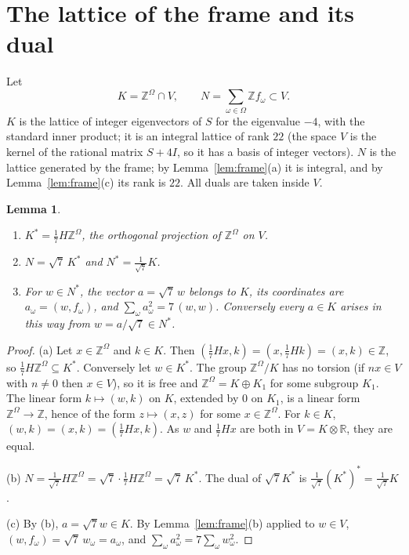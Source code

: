 \documentclass[11pt,a4paper]{article}
\newtheorem{lemma}[theorem]{Lemma}
\theoremstyle{definition}
\theoremstyle{remark}
\newcommand{\ZZ}{\mathbb{Z}}
\newcommand{\RR}{\mathbb{R}}
\newcommand{\Om}{\Omega}
\begin{document}
\section{The lattice of the frame and its dual}\label{sec:lat}

Let
\[
K=\ZZ^{\Om}\cap V,\qquad N=\sum_{\omega\in\Om}\ZZ f_\omega\subset V .
\]
$K$ is the lattice of integer eigenvectors of $S$ for the eigenvalue $-4$, with the standard inner product; it is an
integral lattice of rank $22$ (the space $V$ is the kernel of the rational matrix $S+4I$, so it has a basis of
integer vectors). $N$ is the lattice generated by the frame; by Lemma~\ref{lem:frame}(a) it is integral, and by
Lemma~\ref{lem:frame}(c) its rank is $22$. All duals are taken inside $V$.

\begin{lemma}\label{lem:NK}
\begin{enumerate}[label=\textup{(\alph*)}]
\item $K^*=\frac17H\ZZ^{\Om}$, the orthogonal projection of $\ZZ^{\Om}$ on $V$.
\item $N=\sqrt7\,K^*$ and $N^*=\frac1{\sqrt7}K$.
\item For $w\in N^*$, the vector $a=\sqrt7\,w$ belongs to $K$, its coordinates are $a_\omega=(w,f_\omega)$, and
$\sum_\omega a_\omega^2=7\,(w,w)$. Conversely every $a\in K$ arises in this way from $w=a/\sqrt7\in N^*$.
\end{enumerate}
\end{lemma}
\begin{proof}
(a) Let $x\in\ZZ^{\Om}$ and $k\in K$. Then $(\frac17Hx,k)=(x,\frac17Hk)=(x,k)\in\ZZ$, so $\frac17H\ZZ^{\Om}\subseteq
K^*$. Conversely let $w\in K^*$. The group $\ZZ^{\Om}/K$ has no torsion (if $nx\in V$ with $n\ne0$ then $x\in V$), so
it is free and $\ZZ^{\Om}=K\oplus K_1$ for some subgroup $K_1$. The linear form $k\mapsto(w,k)$ on $K$, extended by
$0$ on $K_1$, is a linear form $\ZZ^{\Om}\to\ZZ$, hence of the form $z\mapsto(x,z)$ for some $x\in\ZZ^{\Om}$. For
$k\in K$, $(w,k)=(x,k)=(\frac17Hx,k)$. As $w$ and $\frac17Hx$ are both in $V=K\otimes\RR$, they are equal.

(b) $N=\frac1{\sqrt7}H\ZZ^{\Om}=\sqrt7\cdot\frac17H\ZZ^{\Om}=\sqrt7\,K^*$. The dual of $\sqrt7K^*$ is
$\frac1{\sqrt7}(K^*)^*=\frac1{\sqrt7}K$.

(c) By (b), $a=\sqrt7w\in K$. By Lemma~\ref{lem:frame}(b) applied to $w\in V$,
$(w,f_\omega)=\sqrt7\,w_\omega=a_\omega$, and $\sum_\omega a_\omega^2=7\sum_\omega w_\omega^2$.
\end{proof}
\end{document}
